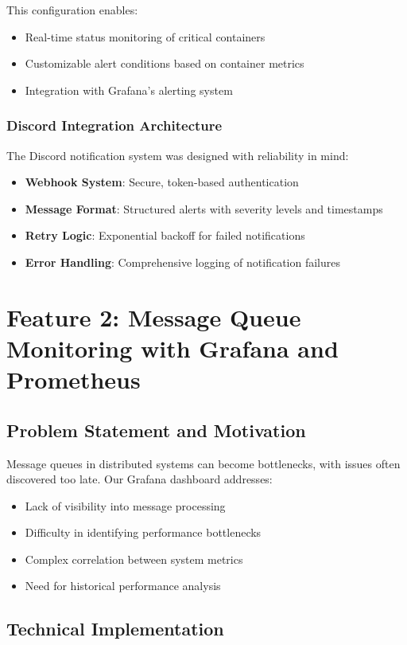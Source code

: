 \documentclass[12pt,a4paper]{article}
\begin{document}
This configuration enables:
\begin{itemize}
    \item Real-time status monitoring of critical containers
    \item Customizable alert conditions based on container metrics
    \item Integration with Grafana's alerting system
\end{itemize}

\subsubsection{Discord Integration Architecture}
The Discord notification system was designed with reliability in mind:
\begin{itemize}
    \item \textbf{Webhook System}: Secure, token-based authentication
    \item \textbf{Message Format}: Structured alerts with severity levels and timestamps
    \item \textbf{Retry Logic}: Exponential backoff for failed notifications
    \item \textbf{Error Handling}: Comprehensive logging of notification failures
\end{itemize}

\newpage

\section{Feature 2: Message Queue Monitoring with Grafana and Prometheus}

\subsection{Problem Statement and Motivation}
Message queues in distributed systems can become bottlenecks, with issues often discovered too late. Our Grafana dashboard addresses:
\begin{itemize}
    \item Lack of visibility into message processing
    \item Difficulty in identifying performance bottlenecks
    \item Complex correlation between system metrics
    \item Need for historical performance analysis
\end{itemize}

\subsection{Technical Implementation}
\end{document}
